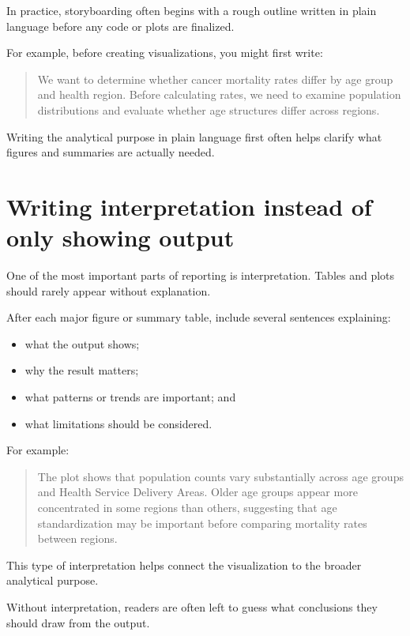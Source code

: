 \documentclass[
  11pt,
  oneside]{book}
\providecommand{\tightlist}{%
  \setlength{\itemsep}{0pt}\setlength{\parskip}{0pt}}
\begin{document}
In practice, storyboarding often begins with a rough outline written in plain language before any code or plots are finalized.

For example, before creating visualizations, you might first write:

\begin{quote}
We want to determine whether cancer mortality rates differ by age group and health region. Before calculating rates, we need to examine population distributions and evaluate whether age structures differ across regions.
\end{quote}

Writing the analytical purpose in plain language first often helps clarify what figures and summaries are actually needed.

\section{Writing interpretation instead of only showing output}\label{writing-interpretation-instead-of-only-showing-output}

One of the most important parts of reporting is interpretation. Tables and plots should rarely appear without explanation.

After each major figure or summary table, include several sentences explaining:

\begin{itemize}
\tightlist
\item
  what the output shows;
\item
  why the result matters;
\item
  what patterns or trends are important; and
\item
  what limitations should be considered.
\end{itemize}

For example:

\begin{quote}
The plot shows that population counts vary substantially across age groups and Health Service Delivery Areas. Older age groups appear more concentrated in some regions than others, suggesting that age standardization may be important before comparing mortality rates between regions.
\end{quote}

This type of interpretation helps connect the visualization to the broader analytical purpose.

Without interpretation, readers are often left to guess what conclusions they should draw from the output.
\end{document}
